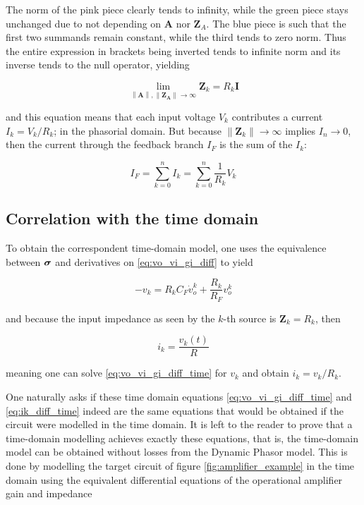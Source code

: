 	The norm of the pink piece clearly tends to infinity, while the green piece stays unchanged due to not depending on $\mathbf{A}$ nor $\mathbf{Z}_A$. The blue piece is such that the first two summands remain constant, while the third tends to zero norm. Thus the entire expression in brackets being inverted tends to infinite norm and its inverse tends to the null operator, yielding

\begin{equation} \lim\limits_{\left\lVert\mathbf{A}\right\rVert,\left\lVert\mathbf{Z_A}\right\rVert\to\infty } \mathbf{Z}_k = R_k\mathbf{I} \end{equation}

	\noindent and this equation means that each input voltage $V_k$ contributes a current $I_k = V_k/R_k$; in the phasorial domain. But because $\left\lVert \mathbf{Z}_k\right\rVert \to \infty$ implies $I_n\to 0$, then the current through the feedback branch $I_F$ is the sum of the $I_k$:

\begin{equation} I_F = \sum\limits_{k=0}^n I_k = \sum\limits_{k=0}^n \dfrac{1}{R_k} V_k \label{eq:if_ideal} \end{equation}

\subsection{Correlation with the time domain} %

	To obtain the correspondent time-domain model, one uses the equivalence between $\boldsymbol{\sigma}$ and derivatives on \eqref{eq:vo_vi_gi_diff} to yield

\begin{equation} -v_k = R_k C_F \dot{v}_o^k + \dfrac{R_k}{R_F}v_o^k \label{eq:vo_vi_gi_diff_time}\end{equation}

	\noindent and because the input impedance as seen by the $k$-th source is $\mathbf{Z}_k = R_k$, then

\begin{equation} i_k = \dfrac{v_k(t)}{R} \label{eq:ik_diff_time}\end{equation}

	\noindent meaning one can solve \eqref{eq:vo_vi_gi_diff_time} for $v_k$ and obtain $i_k = v_k/R_k$.

	One naturally asks if these time domain equations \eqref{eq:vo_vi_gi_diff_time} and \eqref{eq:ik_diff_time} indeed are the same equations that would be obtained if the circuit were modelled in the time domain. It is left to the reader to prove that a time-domain modelling achieves exactly these equations, that is, the time-domain model can be obtained without losses from the Dynamic Phasor model. This is done by modelling the target circuit of figure \ref{fig:amplifier_example} in the time domain using the equivalent differential equations of the operational amplifier gain and impedance

